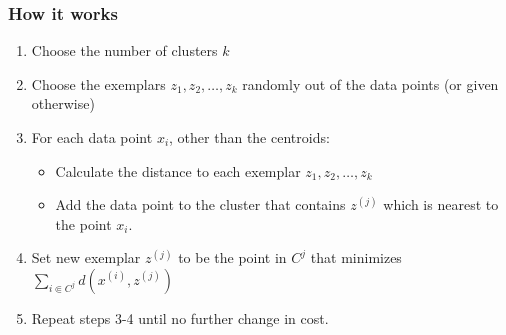 \documentclass[a4paper]{article}
\begin{document}
\subsubsection{How it works}
\begin{enumerate}
	\item Choose the number of clusters $k$
	\item Choose the exemplars $z_1, z_2, \ldots, z_k$ randomly out of the data points (or given otherwise)
	\item For each data point $x_i$, other than the centroids:
	\begin{itemize}[label=$\circ$]
		\item Calculate the distance to each exemplar $z_1, z_2, \ldots, z_k$
		\item Add the data point to the cluster that contains $z^{(j)}$ which is nearest to the point $x_i$.
	\end{itemize}
	\item Set new exemplar $z^{(j)}$ to be the point in $C^j$ that minimizes $\sum_{i\Subset C^j} d(x^{(i)},z^{(j)})$
	\item Repeat steps 3-4 until no further change in cost.
\end{enumerate}
\end{document}
